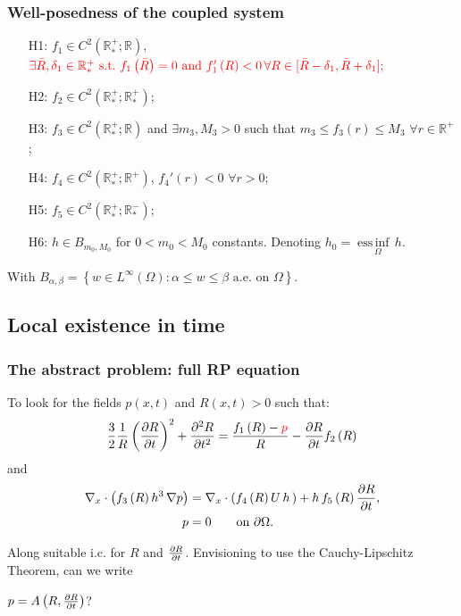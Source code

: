 \documentclass[10pt,aspectratio=169]{beamer}
\DeclareMathOperator*{\essinf}{ess\,inf}
\begin{document}
\begin{frame}
\frametitle{Well-posedness of the coupled system}
\begin{itemize}
	\item[H1:] $f_1\in C^2\left(\mathbb{R}^+_*;\mathbb{R}\right)$, ${\color{red}\exists \bar{R},\delta_1\in\mathbb{R}^+_*~\text{s.t.}~f_1\left(\bar{R}\right)=0~\text{and}~f'_1\left(R\right)<0\, \forall R \in [\bar{R}-\delta_1,\bar{R}+\delta_1];}$
	\item[H2:] $f_2\in C^2\left(\mathbb{R}_*^+;\mathbb{R}^+_*\right)$;
	\item[H3:] $f_3\in C^2\left(\mathbb{R}_*^+;\mathbb{R}\right)$ and $\exists m_3,M_3>0$ such that $m_3\leq f_3\left(r\right)\leq M_3$ $\forall r\in \mathbb{R}^+$;
	\item[H4:] $f_4\in C^2\left(\mathbb{R}_*^+;\mathbb{R}^+\right)$, $f_4'\left(r\right)<0$ $\forall r>0$;
	\item[H5:] $f_5\in C^2\left(\mathbb{R}_*^+;\mathbb{R}^-_*\right)$;
	\item[H6:] $h \in B_{m_0,M_0}$ for $0<m_0<M_0$ constants. Denoting $h_0=\underset{\Omega}{\essinf{\,h}}$.
\end{itemize}
With $B_{\alpha,\beta	}=\left\{w\in L^\infty\left(\Omega\right):\alpha \leq w \leq \beta\mbox{ a.e. on } \Omega \right\}.$
\end{frame} 

\subsection{Local existence in time}
\begin{frame}
\tableofcontents[
currentsection,
currentsubsection,
subsectionstyle=show/shaded/hide
]
\end{frame}


\begin{frame}
\frametitle{The abstract problem: full RP equation}
To look for the fields $p(x,t)$ and $R(x,t)>0$ such that:
\begin{equation*}
\frac{3}{2}\frac{1}{R}\left(\frac{\partial R}{\partial t}\right)^2+\frac{\partial^2 R}{\partial t^2}=\frac{f_1\left(R\right)-{\color{red}p}}{R}-\frac{\partial R}{\partial t}f_2\left(R\right)
\end{equation*}
and
\begin{align*}
\begin{split}
\nabla_x\cdot \left(f_3\left(R\right) h^3\,\nabla p\right)&=\nabla_x\cdot \left(f_4\left(R\right)U\,h\,\right)+h\,f_5\left(R\right)\frac{\partial R}{\partial t},\\
p&=0 \qquad\mbox{on } \partial \Omega.
\end{split}
\end{align*}

Along suitable i.c. for $R$ and $\frac{\partial R}{\partial t}$. Envisioning to use the Cauchy-Lipschitz Theorem, can we write
\begin{center}
 {\color{red}$p=A\left(R,\frac{\partial R}{\partial t}\right)$}?
\end{center}
\end{frame} 
\end{document}
